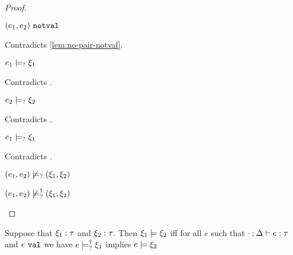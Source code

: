\begin{proof}
\begin{byCases}
\begin{byCases}
\begin{byCases}
\begin{byCases}
\begin{pfsteps*}
                \item $(e_1 , e_2) ~\mathtt{notval}$ 
                \end{pfsteps*}
                Contradicts \autoref{lem:no-pair-notval}.
            \item[\text{(\ref{rule:CMSPair1})}]
                \begin{pfsteps*}
                \item $e_1 \models_{?} \xi_1$ 
                \end{pfsteps*}
                Contradicts .
            \item[\text{(\ref{rule:CMSPair2})}]
                \begin{pfsteps*}
                \item $e_2 \models_{?} \xi_2$ 
                \end{pfsteps*}
                Contradicts .
            \item[\text{(\ref{rule:CMSPair3})}]
                \begin{pfsteps*}
                \item $e_1 \models_{?} \xi_1$ 
                \end{pfsteps*}
                Contradicts .
            \end{byCases}
            \begin{pfsteps*}
            \item $(e_1 , e_2) \not\models_{?} (\xi_1 , \xi_2)$  
            \item $(e_1 , e_2) \not\models_{?}^{\dag} (\xi_1 , \xi_2)$ 
            \end{pfsteps*}
        \end{byCases}
    \end{byCases}
\resetpfcounter
\end{byCases}
\end{proof}

\begin{definition}
  \label{defn:const-entailment}
  Suppose that $\xi_1 : \tau$ and $\xi_2 : \tau$.
  Then $\xi_1 \models \xi_2$ iff for all $e$ such that $\cdot \mathbin{;} \Delta \vdash e : \tau$ and $e ~\mathtt{val}$ we have $e \models_{?}^{\dag} \xi_1$ implies $e \models \xi_2$
\end{definition}

